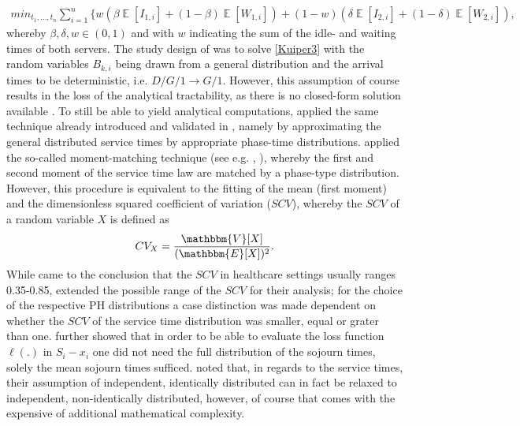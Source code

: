 \documentclass[11pt,a4paper]{article}
\DeclareMathOperator{\EX}{\mathbb{E}}%
\begin{document}
\begin{spacing}{1.8}
\begin{align} \label{Kuiper3}
min_{t_1,\dots,t_n}  \sum_{i=1}^{n}\{ w \left(\beta \EX \left[I_{1,i}\right] + (1-\beta) \EX \left[W_{1,i}\right] \right) + (1-w)\left( \delta \EX \left[I_{2,i}\right] + (1-\delta) \EX \left[W_{2,i}\right] \right), \end{align}
whereby \(\beta, \delta, w \in \left(0,1\right)\) and with \(w\) indicating the sum of the idle- and waiting times of both servers. The study design of \citep{Kuiper2015} was to solve \eqref{Kuiper3} with the random variables \(B_{k,i}\) being drawn from a general distribution and the arrival times to be deterministic, i.e. \( D/G/1 \rightarrow G/1\). However, this assumption of course results in the loss of the analytical tractability, as there is no closed-form solution available \citep{Kuiper2014}. To still be able to yield analytical computations, \citet{Kuiper2015}  applied the same technique already introduced and validated in \citep{Kuiper2014}, namely by approximating the general distributed service times by appropriate phase-time distributions. \citet{Kuiper2015} applied the so-called moment-matching technique (see e.g. \citep{Bosch2000}, \citep{Tijms1986}), whereby the first and second moment of the service time law are matched by a phase-type distribution. However, this procedure is equivalent to the fitting of the mean (first moment) and the dimensionless squared coefficient of variation (\(SCV\)), whereby the \(SCV\) of a random variable \(X\) is defined as
\begin{align} CV_X = \frac{\mathbbm{V}[X]}{{(\mathbbm{E}[X]})^2}. \end{align}
While \citet{CAYIRLI2009} came to the conclusion that  the \(SCV\) in healthcare settings usually ranges 0.35-0.85, \citet{Kuiper2015} extended the possible range of the \(SCV\) for their analysis; for the choice of the respective PH distributions a case distinction was made dependent on whether the \(SCV\) of the service time distribution was smaller, equal or grater than one. 
\citet{Kuiper2015} further showed that in order to be able to evaluate the loss function \(\ell(.)\) in \(S_i - x_i\) one did not need the full distribution of the sojourn times, solely the mean sojourn times sufficed. \citet{Kuiper2015} noted that, in regards to the service times, their assumption of independent, identically distributed  can in fact be relaxed to independent, non-identically distributed, however, of course that comes with the expensive of additional mathematical complexity. \\

\end{spacing}
\end{document}
